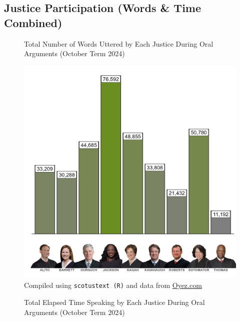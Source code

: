 \begin{landscape}  %

\subsection{Justice Participation (Words \& Time Combined)}


\begin{figure}[!htb]
\centering  %
\begin{minipage}{0.6\textwidth}  %
    \centering
    \caption{Total Number of Words Uttered by Each Justice During Oral Arguments (October Term 2024)}
    \vspace{2mm}
    \includegraphics[width=1.1\textwidth]{../oral_arguments/analyses/Combined/justice_words_combined.png}
    \small{Compiled using \texttt{scotustext (R)} and data from \textcolor{blue}{\href{https://www.oyez.org/}{Oyez.com}}}
\end{minipage}
\hspace{10mm}  %
\begin{minipage}{0.6\textwidth}  %
    \centering
    \caption{Total Elapsed Time Speaking by Each Justice During Oral Arguments (October Term 2024)}

\end{minipage}
\end{figure}
\end{landscape}
